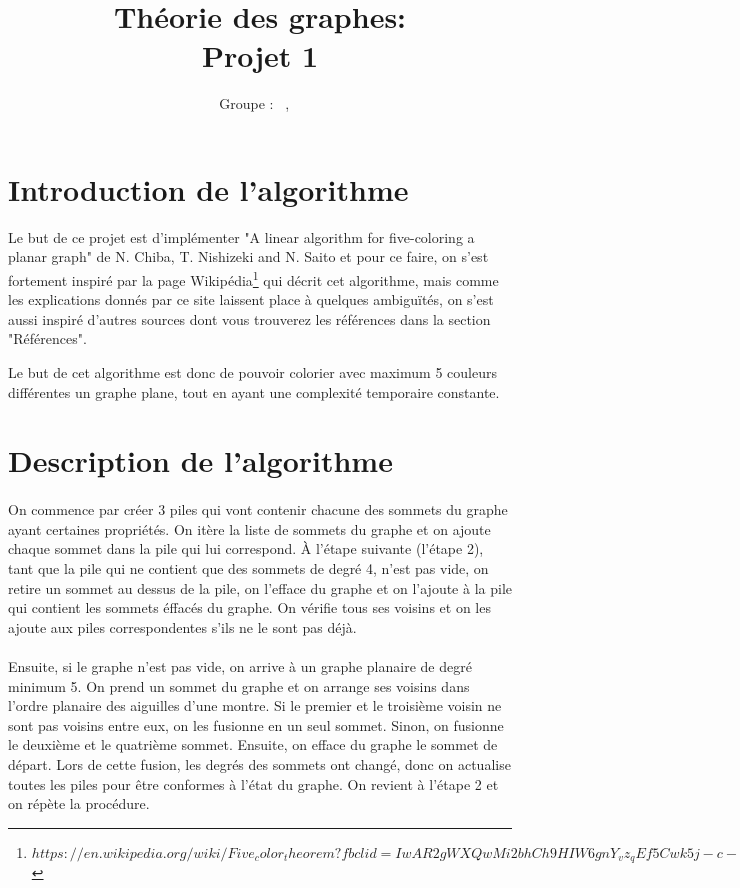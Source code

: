 \documentclass[a4paper, 11pt, oneside]{article}
\title{Théorie des graphes: \\ Projet 1\intitule}
\author{Groupe \GrNbr : \PrenomUN~\textsc{\NomUN}, \PrenomDEUX~\textsc{\NomDEUX}}
\date{}
\begin{document}
	\maketitle
	
	\newpage
	
	\section{Introduction de l'algorithme}
	Le but de ce projet est d'implémenter "A linear algorithm for five-coloring a planar graph" de N. Chiba, T. Nishizeki and N. Saito et pour ce faire, on s'est fortement inspiré par la page Wikipédia\footnote{$https://en.wikipedia.org/wiki/Five_color_theorem?fbclid=IwAR2gWXQwMi2bhCh9HIW6gnY_vz_qEf5Cwk5j-c-YYZk23LTf-KPZSMsBNJY$} qui décrit cet algorithme, mais comme les explications donnés par ce site laissent place à quelques ambiguïtés, on s'est aussi inspiré d'autres sources dont vous trouverez les références dans la section "Références".
	\par Le but de cet algorithme est donc de pouvoir colorier avec maximum 5 couleurs différentes un graphe plane, tout en ayant une complexité temporaire constante.

	\section{Description de l'algorithme}
	\paragraph*{}
	On commence par créer 3 piles qui vont contenir chacune des sommets du graphe ayant certaines propriétés. On itère la liste de sommets du graphe et on ajoute chaque sommet dans la pile qui lui correspond. À l'étape suivante (l'étape 2), tant que la pile qui ne contient que des sommets de degré 4, n'est pas vide, on retire un sommet au dessus de la pile, on l'efface du graphe et on l'ajoute à la pile qui contient les sommets éffacés du graphe. On vérifie tous ses voisins et on les ajoute aux piles correspondentes s'ils ne le sont pas déjà.
	\paragraph{}
	Ensuite, si le graphe n'est pas vide, on arrive à un graphe planaire de degré minimum 5. On prend un sommet du graphe et on arrange ses voisins dans l'ordre planaire des aiguilles d'une montre. Si le premier et le troisième voisin ne sont pas voisins entre eux, on les fusionne en un seul sommet. Sinon, on fusionne le deuxième et le quatrième sommet. Ensuite, on efface du graphe le sommet de départ. Lors de cette fusion, les degrés des sommets ont changé, donc on actualise toutes les piles pour être conformes à l'état du graphe. On revient à l'étape 2 et on répète la procédure.
\end{document}
